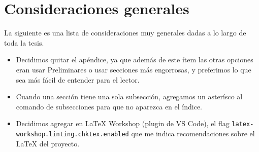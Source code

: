 \section*{Consideraciones generales}

La siguiente es una lista de consideraciones muy generales dadas a lo largo de toda la tesis.
\begin{itemize}
    \item Decidimos quitar el ap\'endice, ya que además de este ítem las otras opciones eran usar Preliminares o usar secciones más engorrosas, y preferimos lo que sea más fácil de entender para el lector.
    \item Cuando una sección tiene una sola subsección, agregamos un asterísco al comando de subsecciones para que no aparezca en el índice.
    \item Decidimos agregar en LaTeX Workshop (plugin de VS Code), el flag \texttt{latex-workshop.linting.chktex.enabled} que me indica recomendaciones sobre el LaTeX del proyecto.
\end{itemize}

